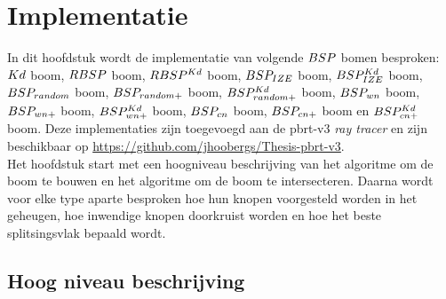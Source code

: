 \chapter{Implementatie}
\label{hoofdstuk:implementatie}
In dit hoofdstuk wordt de implementatie van volgende $BSP$ bomen besproken: $Kd$ boom, $RBSP$ boom, $RBSP^{Kd}$ boom, $BSP_{IZE}$ boom, $BSP^{Kd}_{IZE}$ boom, $BSP_{random}$ boom, $BSP_{random+}$ boom, $BSP^{Kd}_{random+}$ boom, $BSP_{wn}$ boom, $BSP_{wn+}$ boom, $BSP^{Kd}_{wn+}$ boom, $BSP_{cn}$ boom, $BSP_{cn+}$ boom en $BSP^{Kd}_{cn+}$ boom.
Deze implementaties zijn toegevoegd aan de pbrt-v3 \textit{ray tracer} \cite{pbrt} en zijn beschikbaar op \url{https://github.com/jhoobergs/Thesis-pbrt-v3}.\\

Het hoofdstuk start met een hoogniveau beschrijving van het algoritme om de boom te bouwen en het algoritme om de boom te intersecteren.
Daarna wordt voor elke type aparte besproken hoe hun knopen voorgesteld worden in het geheugen, hoe inwendige knopen doorkruist worden en hoe het beste splitsingsvlak bepaald wordt.

\lstset{style=pseudoStyle}

\section{Hoog niveau beschrijving}
\label{sec:h4-hoog-niveau}
